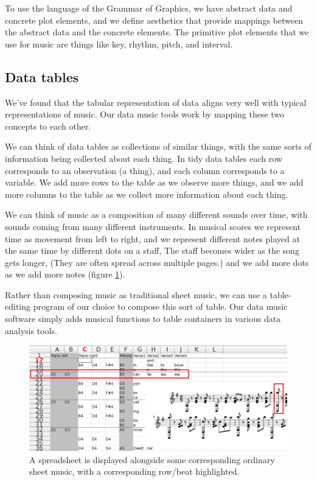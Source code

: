 \documentclass{acm_proc_article-sp}
\begin{document}
To use the language of the Grammar of Graphics, \cite{grammar}
we have abstract data and concrete plot elements,
and we define aesthetics that provide mappings
between the abstract data and the concrete elements.
The primitive plot elements that we use for music are things
like key, rhythm, pitch, and interval.

\subsection{Data tables}
We've found that the tabular representation of data aligns very well with
typical representations of music. Our data music tools work by mapping these
two concepts to each other.

We can think of data tables as collections of similar things, with the
same sorts of information being collected about each thing. In tidy data
tables \cite{tidydata} each row corresponds to an observation (a thing),
and each column corresponds to a variable. We add more rows to the table
as we observe more things, and we add more columns to the table as we
collect more information about each thing.

We can think of music as a composition of many different sounds over time,
with sounds coming from many different instruments. In musical scores
we represent time as movement from left to right, and we represent different
notes played at the same time by different dots on a staff,
The staff becomes wider as the song gets longer, (They are often spread
across multiple pages.) and we add more dots as we add more notes
(figure \ref{highlight}).

Rather than composing music as traditional sheet music,
we can use a table-editing program of our choice to compose
this sort of table. Our data music software simply adds
musical functions to table containers in various data analysis
tools.

\begin{figure} \label{highlight}
\centering
\caption{A spreadsheet is displayed alongside some corresponding ordinary sheet music, with a corresponding row/beat highlighted.}
\includegraphics[width=\textwidth]{../sheetmusic/sheetmusic-side-by-side-highlighted-rowbeat.png}
\end{figure}
\end{document}
